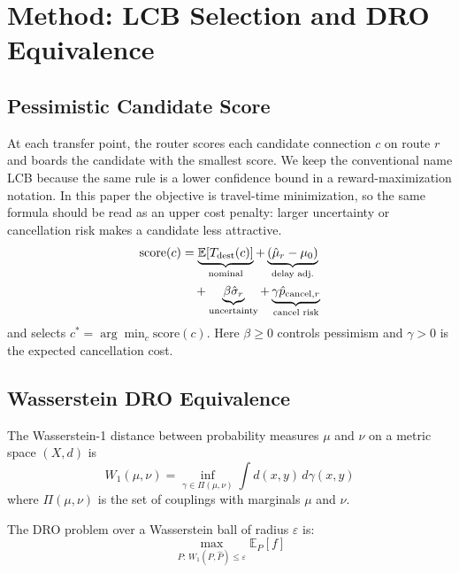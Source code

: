 \documentclass[opre,dblanonrev]{informs4}
\begin{document}
\section{Method: LCB Selection and DRO Equivalence}
\label{sec:method}

\subsection{Pessimistic Candidate Score}

At each transfer point, the router scores each candidate connection
$c$ on route $r$ and boards the candidate with the smallest score.
We keep the conventional name LCB because the same rule is a lower
confidence bound in a reward-maximization notation. In this paper the
objective is travel-time minimization, so the same formula should be
read as an upper cost penalty: larger uncertainty or cancellation
risk makes a candidate less attractive.
\begin{align}
    \text{score}(c) &= \underbrace{\mathbb{E}[T_{\mathrm{dest}}(c)]}_{\text{nominal}}
       + \underbrace{(\hat{\mu}_r - \mu_0)}_{\text{delay adj.}} \notag\\
    &\quad + \underbrace{\beta \hat{\sigma}_r}_{\text{uncertainty}}
       + \underbrace{\gamma \hat{p}_{\mathrm{cancel},r}}_{\text{cancel risk}}
    \label{eq:lcb}
\end{align}
and selects $c^* = \arg\min_c \text{score}(c)$. Here $\beta \geq 0$ controls pessimism and $\gamma > 0$ is the expected cancellation cost.

\subsection{Wasserstein DRO Equivalence}

The Wasserstein-1 distance between probability measures $\mu$ and $\nu$ on a metric space $(X, d)$ is
\begin{equation}
    W_1(\mu, \nu) = \inf_{\gamma \in \Pi(\mu,\nu)} \int d(x,y)\, d\gamma(x,y)
    \label{eq:W1}
\end{equation}
where $\Pi(\mu,\nu)$ is the set of couplings with marginals $\mu$ and $\nu$.

The DRO problem over a Wasserstein ball of radius $\varepsilon$ is:
\begin{equation}
    \max_{P:\, W_1(P, \hat{P}) \leq \varepsilon} \mathbb{E}_P[f]
    \label{eq:dro}
\end{equation}
\end{document}
